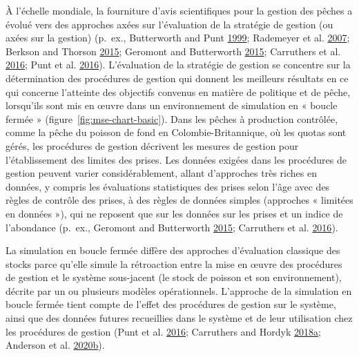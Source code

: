 \documentclass[11pt]{book}
\begin{document}
À l'échelle mondiale, la fourniture d'avis scientifiques pour la gestion des pêches a évolué vers des approches axées sur l'évaluation de la stratégie de gestion (ou axées sur la gestion) (p.~ex., Butterworth and Punt \protect\hyperlink{ref-butterworth1999}{1999}; Rademeyer et al. \protect\hyperlink{ref-rademeyer2007}{2007}; Berkson and Thorson \protect\hyperlink{ref-berkson2015}{2015}; Geromont and Butterworth \protect\hyperlink{ref-geromont2015}{2015}; Carruthers et al. \protect\hyperlink{ref-carruthers2016}{2016}; Punt et al. \protect\hyperlink{ref-punt2016}{2016}). L'évaluation de la stratégie de gestion se concentre sur la détermination des procédures de gestion qui donnent les meilleurs résultats en ce qui concerne l'atteinte des objectifs convenus en matière de politique et de pêche, lorsqu'ils sont mis en œuvre dans un environnement de simulation en « boucle fermée » (figure~\ref{fig:mse-chart-basic}). Dans les pêches à production contrôlée, comme la pêche du poisson de fond en Colombie-Britannique, où les quotas sont gérés, les procédures de gestion décrivent les mesures de gestion pour l'établissement des limites des prises. Les données exigées dans les procédures de gestion peuvent varier considérablement, allant d'approches très riches en données, y compris les évaluations statistiques des prises selon l'âge avec des règles de contrôle des prises, à des règles de données simples (approches « limitées en données »), qui ne reposent que sur les données sur les prises et un indice de l'abondance (p.~ex., Geromont and Butterworth \protect\hyperlink{ref-geromont2015}{2015}; Carruthers et al. \protect\hyperlink{ref-carruthers2016}{2016}).

La simulation en boucle fermée diffère des approches d'évaluation classique des stocks parce qu'elle simule la rétroaction entre la mise en œuvre des procédures de gestion et le système sous-jacent (le stock de poisson et son environnement), décrite par un ou plusieurs modèles opérationnels. L'approche de la simulation en boucle fermée tient compte de l'effet des procédures de gestion sur le système, ainsi que des données futures recueillies dans le système et de leur utilisation chez les procédures de gestion (Punt et al. \protect\hyperlink{ref-punt2016}{2016}; Carruthers and Hordyk \protect\hyperlink{ref-carruthers2018}{2018}\protect\hyperlink{ref-carruthers2018}{a}; Anderson et al. \protect\hyperlink{ref-anderson2020gfmp}{2020}\protect\hyperlink{ref-anderson2020gfmp}{b}).
\end{document}
